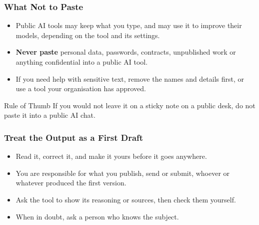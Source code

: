 \begin{frame}[fragile]\frametitle{What Not to Paste}
\begin{itemize}
\item Public AI tools may keep what you type, and may use it to improve their models, depending on the tool and its settings.
\item \textbf{Never paste} personal data, passwords, contracts, unpublished work or anything confidential into a public AI tool.
\item If you need help with sensitive text, remove the names and details first, or use a tool your organisation has approved.
\end{itemize}
\begin{alertblock}{Rule of Thumb}
If you would not leave it on a sticky note on a public desk, do not paste it into a public AI chat.
\end{alertblock}
\end{frame}

\begin{frame}[fragile]\frametitle{Treat the Output as a First Draft}
\begin{itemize}
\item Read it, correct it, and make it yours before it goes anywhere.
\item You are responsible for what you publish, send or submit, whoever or whatever produced the first version.
\item Ask the tool to show its reasoning or sources, then check them yourself.
\item When in doubt, ask a person who knows the subject.
\end{itemize}
\end{frame}
